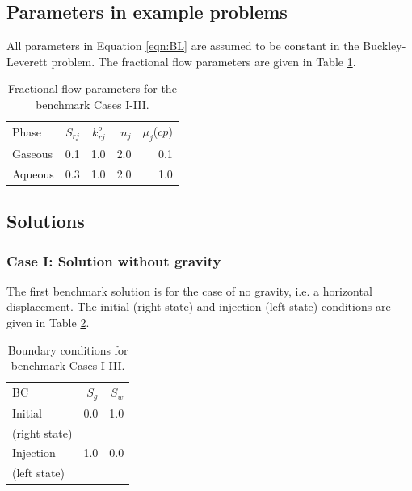 \subsection{Parameters in example problems}
All parameters in Equation \ref{eqn:BL} are assumed to be constant in the Buckley-Leverett problem.  The fractional flow parameters are given in Table \ref{table:paras}.

\begin{table}[h]
\begin{center}
\begin{tabular}{lrrrr}
\hline
Phase&$S_{rj}$&$k_{rj}^o$&$n_j$& $\mu_j$($cp$)\\
Gaseous&0.1&1.0&2.0&0.1\\
Aqueous&0.3&1.0&2.0&1.0\\
\hline
\end{tabular}
\caption{Fractional flow parameters for the benchmark Cases I-III.}
\label{table:paras}
\end{center}
\end{table}


\subsection{Solutions}

\subsubsection{Case I: Solution without gravity}
The first benchmark solution is for the case of no gravity, i.e. a horizontal displacement.  The initial (right state) and injection (left state) conditions are given in Table \ref{table:BCs}.

\begin{table}[h]
\begin{center}
\begin{tabular}{lrr}
\hline
BC & $S_g$ & $S_w$\\
Initial& 0.0 & 1.0\\
(right state)&  & \\
Injection&1.0 & 0.0\\
(left state)&  & \\
\hline
\end{tabular}
\caption{Boundary conditions for benchmark Cases I-III. }
\label{table:BCs}
\end{center}
\end{table}



